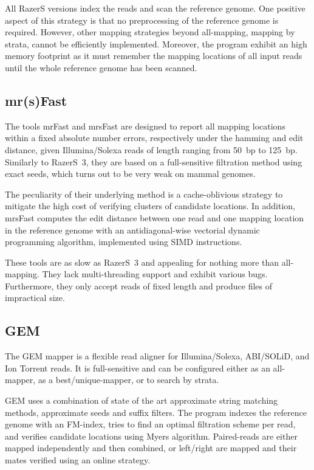 All RazerS versions index the reads and scan the reference genome.
One positive aspect of this strategy is that no preprocessing of the reference genome is required.
However, other mapping strategies beyond all-mapping, \eg mapping by strata, cannot be efficiently implemented.
Moreover, the program exhibit an high memory footprint as it must remember the mapping locations of all input reads until the whole reference genome has been scanned.


\subsection{mr(s)Fast}

The tools mrFast \citep{Ahmadi2011} and mrsFast \citep{Hach2010} are designed to report all mapping locations within a fixed absolute number errors, respectively under the hamming and edit distance, given Illumina/Solexa reads of length ranging from 50~bp to 125~bp.
Similarly to RazerS~3, they are based on a full-sensitive filtration method using exact seeds, which turns out to be very weak on mammal genomes.

The peculiarity of their underlying method is a cache-oblivious strategy to mitigate the high cost of verifying clusters of candidate locations.
In addition, mrsFast computes the edit distance between one read and one mapping location in the reference genome with an antidiagonal-wise vectorial dynamic programming algorithm, implemented using SIMD instructions.

These tools are as slow as RazerS~3 and appealing for nothing more than all-mapping.
They lack multi-threading support and exhibit various bugs.
Furthermore, they only accept reads of fixed length and produce files of impractical size.


\subsection{GEM}

The GEM mapper \citep{Gem} is a flexible read aligner for Illumina/Solexa, ABI/SOLiD, and Ion Torrent reads.
It is full-sensitive and can be configured either as an all-mapper, as a best/unique-mapper, or to search by strata.

GEM uses a combination of state of the art approximate string matching methods, \eg approximate seeds and suffix filters.
The program indexes the reference genome with an FM-index, tries to find an optimal filtration scheme per read, and verifies candidate locations using Myers algorithm.
Paired-reads are either mapped independently and then combined, or left/right are mapped and their mates verified using an online strategy.

